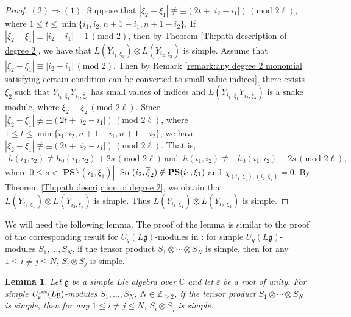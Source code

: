 \documentclass[12pt, reqno]{amsart}
\newtheorem{lemma}[theorem]{Lemma}
\numberwithin{equation}{section}
\newcommand{\CC}{\mathbb{C}}
\newcommand{\ZZ}{\mathbb{Z}}
\newcommand{\res}{{\rm res}}
\begin{document}
{\begin{proof}
$(2)\Rightarrow(1)$. Suppose that $|\xi_2-\xi_1| \not\equiv \pm(2t+|i_2-i_1|)\,(\text{mod } 2 \ell)$, where $1\leq t\le \min\{i_1, i_2, n+1-i_1, n+1-i_2\}$. If $|\xi_2-\xi_1| \equiv |i_2-i_1|+1 \,(\text{mod } 2 )$, then by Theorem \ref{Th:path description of degree 2}, we have that $L(Y_{i_1,\xi_1})\otimes L(Y_{i_2,\xi_2})$ is simple. Assume that $|\xi_2-\xi_1| \equiv |i_2-i_1| \,(\text{mod } 2 )$. Then by Remark \ref{remark:any degree 2 monomial satisfying certain condition can be converted to small value indices}, there exists $\overline{\xi}_2$ such that $Y_{i_1,\xi_1}Y_{i_2,\overline{\xi}_2}$ has small values of indices and $L(Y_{i_1,\xi_1}Y_{i_2,\overline{\xi}_2})$ is a snake module, where $\overline{\xi}_2 \equiv \xi_2\,(\text{mod } 2 \ell)$. Since $|\xi_2-\xi_1| \not\equiv \pm(2t+|i_2-i_1|)\,(\text{mod } 2 \ell)$, where $1\leq t\leq \min\{i_1, i_2, n+1-i_1, n+1-i_2\}$, we have $|\overline{\xi}_2-\xi_1| \not\equiv \pm(2t+|i_2-i_1|)\,(\text{mod } 2 \ell)$. That is,
\begin{align*}
h(i_1,i_2) \not\equiv h_{0}(i_1,i_2)+2s\,(\text{mod } 2 \ell) \ \text{and } \  h(i_1,i_2) \not\equiv -h_{0}(i_1,i_2)-2s\,(\text{mod } 2 \ell),
\end{align*}
where $0\leq s<|\mathbf{PS}^{i_2}(i_1,\xi_1)|$. So $(i_2, \overline{\xi}_2) \notin {\bf PS}(i_1,\xi_1)$ and $\chi_{(i_1,\xi_1),(i_{2},\overline{\xi}_2)}=0$. By Theorem \ref{Th:path description of degree 2}, we obtain that $L(Y_{i_1,\xi_1})\otimes L(Y_{i_2, \overline{\xi}_2})$ is simple. Thus $L(Y_{i_1,\xi_1})\otimes L(Y_{i_2, \xi_2})$ is simple.
\end{proof}


We will need the following lemma. The proof of the lemma is similar to the proof of the corresponding result for $U_q(L\mathfrak{g})$-modules in \cite{H10}: for simple $U_q(L\mathfrak{g})$-modules $S_1, \ldots, S_N$, if the tensor product $S_1 \otimes \cdots \otimes S_N$ is simple, then for any $1\leq i\neq j\leq N$, $S_i \otimes S_j$ is simple.
\begin{lemma}\label{Le: simple tensor product}
Let $\mathfrak{g}$ be a simple Lie algebra over $\CC$ and let $\varepsilon$ be a root of unity. For simple $U_{\varepsilon}^{\res}({L\mathfrak{g}})$-modules $S_1,\ldots, S_N$, $N\in \ZZ_{\geq 2}$, if the tensor product $S_1 \otimes \cdots \otimes S_N$ is simple, then for any $1\leq i\neq j\leq N$, $S_i \otimes S_j$ is simple.
\end{lemma}

}
\end{document}
